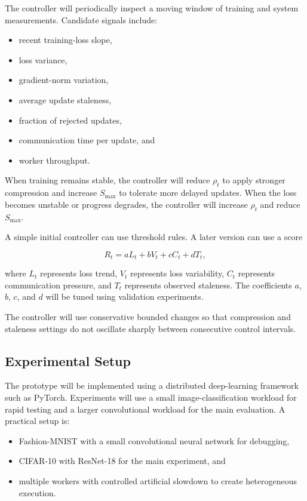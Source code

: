 \documentclass[conference]{IEEEtran}
\begin{document}
The controller will periodically inspect a moving window of training and system measurements. Candidate signals include:
\begin{itemize}
    \item recent training-loss slope,
    \item loss variance,
    \item gradient-norm variation,
    \item average update staleness,
    \item fraction of rejected updates,
    \item communication time per update, and
    \item worker throughput.
\end{itemize}

When training remains stable, the controller will reduce $\rho_t$ to apply stronger compression and increase $S_{\text{max}}$ to tolerate more delayed updates. When the loss becomes unstable or progress degrades, the controller will increase $\rho_t$ and reduce $S_{\text{max}}$.

A simple initial controller can use threshold rules. A later version can use a score

\begin{equation}
R_t = aL_t + bV_t + cC_t + dT_t,
\end{equation}

where $L_t$ represents loss trend, $V_t$ represents loss variability, $C_t$ represents communication pressure, and $T_t$ represents observed staleness. The coefficients $a$, $b$, $c$, and $d$ will be tuned using validation experiments.

The controller will use conservative bounded changes so that compression and staleness settings do not oscillate sharply between consecutive control intervals.

\subsection{Experimental Setup}

The prototype will be implemented using a distributed deep-learning framework such as PyTorch. Experiments will use a small image-classification workload for rapid testing and a larger convolutional workload for the main evaluation. A practical setup is:
\begin{itemize}
    \item Fashion-MNIST with a small convolutional neural network for debugging,
    \item CIFAR-10 with ResNet-18 for the main experiment, and
    \item multiple workers with controlled artificial slowdown to create heterogeneous execution.
\end{itemize}
\end{document}

